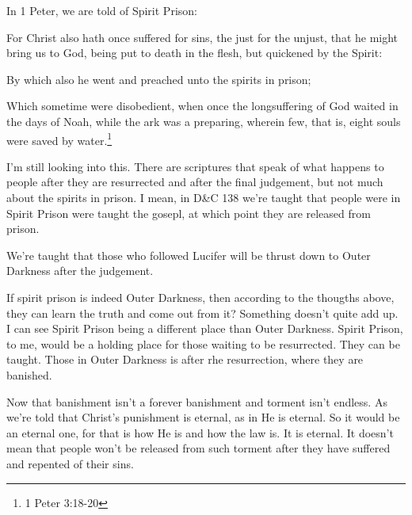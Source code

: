 In 1 Peter, we are told of Spirit Prison:

\begin{displayquote}
For Christ also hath once suffered for sins, the just for the unjust, that he might 
bring us to God, being put to death in the flesh, but quickened by the Spirit:

By which also he went and preached unto the spirits in prison;

Which sometime were disobedient, when once the longsuffering of God waited in the 
days of Noah, while the ark was a preparing, wherein few, that is, eight souls were 
saved by water.\footnote{1 Peter 3:18-20}
\end{displayquote}

I'm still looking into this. There are scriptures that speak of what happens to
people after they are resurrected and after the final judgement, but not much about
the spirits in prison. I mean, in D\&C 138 we're taught that people were in Spirit
Prison were taught the gosepl, at which point they are released from prison.

We're taught that those who followed Lucifer will be thrust down to Outer Darkness
after the judgement.

If spirit prison is indeed Outer Darkness, then according to the thougths above, they
can learn the truth and come out from it? Something doesn't quite add up. I can see
Spirit Prison being a different place than Outer Darkness. Spirit Prison, to me,
would be a holding place for those waiting to be resurrected. They can be taught.
Those in Outer Darkness is after rhe resurrection, where they are banished.

Now that banishment isn't a forever banishment and torment isn't endless. As we're
told that Christ's punishment is eternal, as in He is eternal. So it would be an
eternal one, for that is how He is and how the law is. It is eternal. It doesn't mean
that people won't be released from such torment after they have suffered and repented
of their sins.
